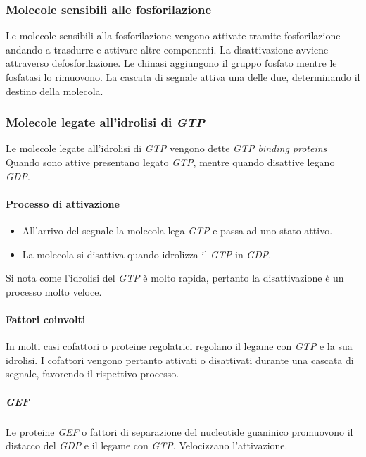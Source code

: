 		\subsubsection{Molecole sensibili alle fosforilazione}
		Le molecole sensibili alla fosforilazione vengono attivate tramite fosforilazione andando a trasdurre e attivare altre componenti.
		La disattivazione avviene attraverso defosforilazione.
		Le chinasi aggiungono il gruppo fosfato mentre le fosfatasi lo rimuovono.
		La cascata di segnale attiva una delle due, determinando il destino della molecola.

		\subsubsection{Molecole legate all'idrolisi di \emph{GTP}}
		Le molecole legate all'idrolisi di \emph{GTP} vengono dette \emph{GTP binding proteins}
		Quando sono attive presentano legato \emph{GTP}, mentre quando disattive legano \emph{GDP}.

			\paragraph{Processo di attivazione}
			\begin{multicols}{2}
				\begin{itemize}
					\item All'arrivo del segnale la molecola lega \emph{GTP} e passa ad uno stato attivo.
					\item La molecola si disattiva quando idrolizza il \emph{GTP} in \emph{GDP}.
				\end{itemize}
			\end{multicols}
			Si nota come l'idrolisi del \emph{GTP} \`e molto rapida, pertanto la disattivazione \`e un processo molto veloce.

			\paragraph{Fattori coinvolti}
			In molti casi cofattori o proteine regolatrici regolano il legame con \emph{GTP} e la sua idrolisi.
			I cofattori vengono pertanto attivati o disattivati durante una cascata di segnale, favorendo il rispettivo processo.
				
				\subparagraph{\emph{GEF}}
				Le proteine \emph{GEF} o fattori di separazione del nucleotide guaninico promuovono il distacco del \emph{GDP} e il legame con \emph{GTP}.
				Velocizzano l'attivazione.


